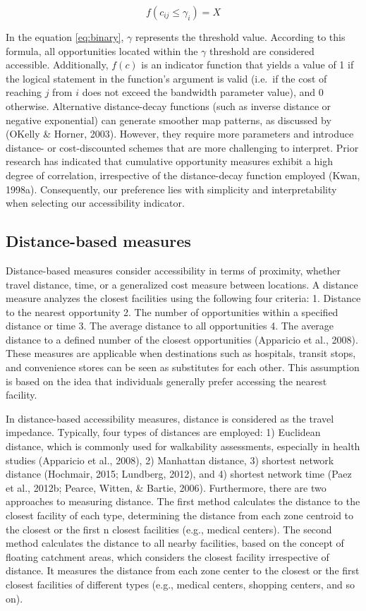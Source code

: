 \documentclass[
11pt, %
oneside, %
english, %
singlespacing, %
]{macthesis} %
\begin{document}
\begin{equation}
f(c_{ij} \le \gamma _i) = X
\label{eq:binary}
\end{equation}

In the equation \ref{eq:binary}, \(\gamma\) represents the threshold value. According to this formula, all opportunities located within the \(\gamma\) threshold are considered accessible. Additionally, \(f(c)\) is an indicator function that yields a value of 1 if the logical statement in the function's argument is valid (i.e.~if the cost of reaching \(j\) from \(i\) does not exceed the bandwidth parameter value), and 0 otherwise. Alternative distance-decay functions (such as inverse distance or negative exponential) can generate smoother map patterns, as discussed by (OKelly \& Horner, 2003). However, they require more parameters and introduce distance- or cost-discounted schemes that are more challenging to interpret. Prior research has indicated that cumulative opportunity measures exhibit a high degree of correlation, irrespective of the distance-decay function employed (Kwan, 1998a). Consequently, our preference lies with simplicity and interpretability when selecting our accessibility indicator.

\subsection{Distance-based measures}\label{distance-based-measures}

Distance-based measures consider accessibility in terms of proximity, whether travel distance, time, or a generalized cost measure between locations. A distance measure analyzes the closest facilities using the following four criteria:
1. Distance to the nearest opportunity
2. The number of opportunities within a specified distance or time
3. The average distance to all opportunities
4. The average distance to a defined number of the closest opportunities (Apparicio et al., 2008). These measures are applicable when destinations such as hospitals, transit stops, and convenience stores can be seen as substitutes for each other. This assumption is based on the idea that individuals generally prefer accessing the nearest facility.

In distance-based accessibility measures, distance is considered as the travel impedance. Typically, four types of distances are employed: 1) Euclidean distance, which is commonly used for walkability assessments, especially in health studies (Apparicio et al., 2008), 2) Manhattan distance, 3) shortest network distance (Hochmair, 2015; Lundberg, 2012), and 4) shortest network time (Paez et al., 2012b; Pearce, Witten, \& Bartie, 2006). Furthermore, there are two approaches to measuring distance. The first method calculates the distance to the closest facility of each type, determining the distance from each zone centroid to the closest or the first n closest facilities (e.g., medical centers). The second method calculates the distance to all nearby facilities, based on the concept of floating catchment areas, which considers the closest facility irrespective of distance. It measures the distance from each zone center to the closest or the first closest facilities of different types (e.g., medical centers, shopping centers, and so on).
\end{document}
